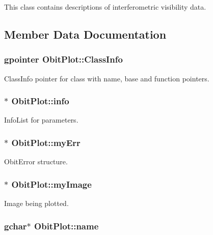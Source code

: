 This class contains descriptions of interferometric visibility data. 



\subsection{Member Data Documentation}
\subsubsection{\setlength{\rightskip}{0pt plus 5cm}gpointer {\bf Obit\-Plot::Class\-Info}}\label{structObitPlot_o1}


Class\-Info pointer for class with name, base and function pointers. 

\subsubsection{$\ast$ {\bf Obit\-Plot::info}}\label{structObitPlot_o5}


Info\-List for parameters. 

\subsubsection{$\ast$ {\bf Obit\-Plot::my\-Err}}\label{structObitPlot_o7}


Obit\-Error structure. 

\subsubsection{$\ast$ {\bf Obit\-Plot::my\-Image}}\label{structObitPlot_o6}


Image being plotted. 

\subsubsection{\setlength{\rightskip}{0pt plus 5cm}gchar$\ast$ {\bf Obit\-Plot::name}}\label{structObitPlot_o3}


